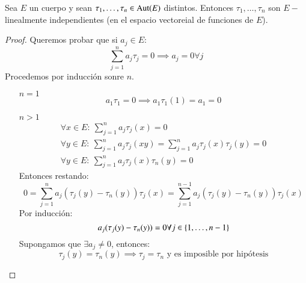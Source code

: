 \begin{thm}[de Dedekind]\label{thm:4.2}
    Sea $E$ un cuerpo y sean $\tau_1, \ldots, \tau_n \in \mathrm{Aut}(E)$ distintos. Entonces $\tau_1, \ldots, \tau_n$ son $E-$linealmente independientes (en el espacio vectoreial de funciones de $E$).
\end{thm}
\begin{proof}
    Queremos probar que si $a_j \in E$:
    $$
        \sum_{j=1}^{n} a_j\tau_j = 0 \implies a_j = 0 \forall j
    $$
    Procedemos por inducción sonre $n$.
    \begin{itemize}
        \item[$n=1$]
        $$
            a_1\tau_1 = 0 \implies a_1\tau_1(1) = a_1 = 0
        $$
        \item[$n>1$]
        \begin{align}
            \forall x  \in E:\ \sum_{j=1}^n a_j\tau_j(x) = 0\\
            \forall y \in E:\ \sum_{j=1}^n a_j\tau_j(xy) = \sum_{j=1}^n a_j\tau_j(x)\tau_j(y) = 0\\
            \forall y \in E:\ \sum_{j=1}^n a_j\tau_j(x)\tau_n(y) = 0
        \end{align}
        Entonces restando:
        $$
            0 = \sum_{j=1}^n a_j(\tau_j(y) - \tau_n(y)) \tau_j(x) = \sum_{j=1}^{n-1} a_j(\tau_j(y)-\tau_n(y))\tau_j(x)
        $$
        Por inducción:
        $$
            a_j(\tau_j(y) - \tau_n(y)) = 0 \forall j \in \left\{1, \ldots, n-1\right\}
        $$
        Supongamos que $\exists a_j \neq 0$, entonces:
        $$
            \tau_j(y) = \tau_n(y) \implies \tau_j = \tau_n \text{ y es imposible por hipótesis}
        $$
    \end{itemize}
\end{proof}

